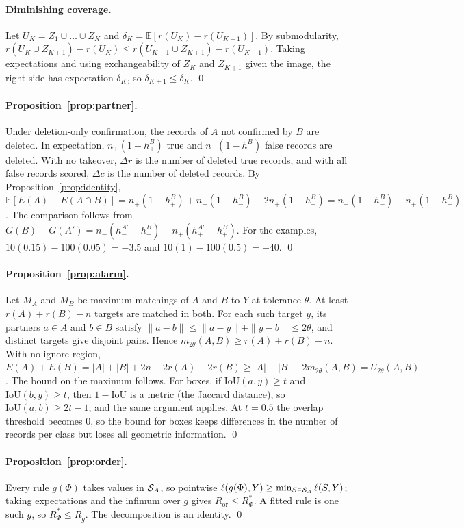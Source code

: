 \paragraph{Diminishing coverage.} Let $U_K=Z_1\cup\dots\cup Z_K$ and $\delta_K=\mathbb{E}[r(U_K)-r(U_{K-1})]$. By submodularity, $r(U_K\cup Z_{K+1})-r(U_K)\le r(U_{K-1}\cup Z_{K+1})-r(U_{K-1})$. Taking expectations and using exchangeability of $Z_K$ and $Z_{K+1}$ given the image, the right side has expectation $\delta_K$, so $\delta_{K+1}\le\delta_K$. \qed

\paragraph{Proposition~\ref{prop:partner}.} Under deletion-only confirmation, the records of $A$ not confirmed by $B$ are deleted. In expectation, $n_+(1-h_+^B)$ true and $n_-(1-h_-^B)$ false records are deleted. With no takeover, $\Delta r$ is the number of deleted true records, and with all false records scored, $\Delta c$ is the number of deleted records. By Proposition~\ref{prop:identity}, $\mathbb{E}[E(A)-E(A\cap B)]=n_+(1-h_+^B)+n_-(1-h_-^B)-2n_+(1-h_+^B)=n_-(1-h_-^B)-n_+(1-h_+^B)$. The comparison follows from $G(B)-G(A')=n_-(h_-^{A'}-h_-^{B})-n_+(h_+^{A'}-h_+^{B})$. For the examples, $10(0.15)-100(0.05)=-3.5$ and $10(1)-100(0.5)=-40$. \qed

\paragraph{Proposition~\ref{prop:alarm}.} Let $M_A$ and $M_B$ be maximum matchings of $A$ and $B$ to $Y$ at tolerance $\theta$. At least $r(A)+r(B)-n$ targets are matched in both. For each such target $y$, its partners $a\in A$ and $b\in B$ satisfy $\|a-b\|\le\|a-y\|+\|y-b\|\le2\theta$, and distinct targets give disjoint pairs. Hence $m_{2\theta}(A,B)\ge r(A)+r(B)-n$. With no ignore region, $E(A)+E(B)=|A|+|B|+2n-2r(A)-2r(B)\ge|A|+|B|-2m_{2\theta}(A,B)=U_{2\theta}(A,B)$. The bound on the maximum follows. For boxes, if $\mathrm{IoU}(a,y)\ge t$ and $\mathrm{IoU}(b,y)\ge t$, then $1-\mathrm{IoU}$ is a metric (the Jaccard distance), so $\mathrm{IoU}(a,b)\ge2t-1$, and the same argument applies. At $t=0.5$ the overlap threshold becomes 0, so the bound for boxes keeps differences in the number of records per class but loses all geometric information. \qed

\paragraph{Proposition~\ref{prop:order}.} Every rule $g(\Phi)$ takes values in $\mathcal{S}_A$, so pointwise $\ell(g(\Phi),Y)\ge\min_{S\in\mathcal{S}_A}\ell(S,Y)$; taking expectations and the infimum over $g$ gives $R_{\mathrm{or}}\le R^*_\Phi$. A fitted rule is one such $g$, so $R^*_\Phi\le R_{\hat g}$. The decomposition is an identity. \qed

